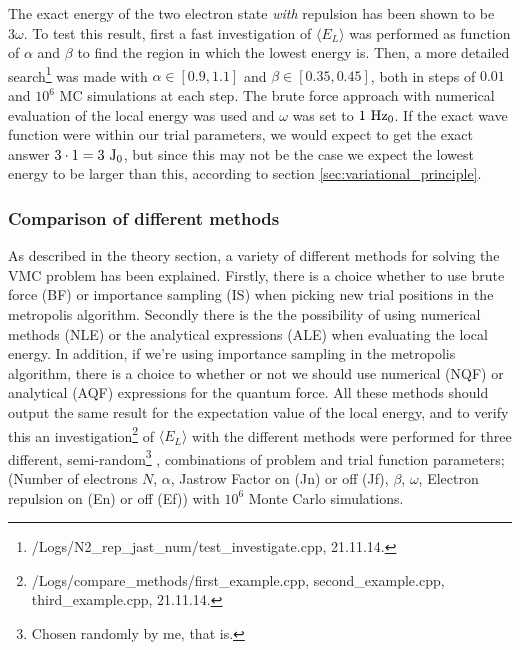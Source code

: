 The exact energy of the two electron state \textit{with} repulsion has been shown \cite{Taut} to be $3 \omega$. 
To test this result, first a fast investigation of $\langle E_L\rangle$ was performed as function of $\alpha$ and $\beta$ to find the region in which the lowest energy is. 
Then, a more detailed search\footnote{/Logs/N2\_rep\_jast\_num/test\_investigate.cpp, 21.11.14.} was made with $\alpha \in [0.9,1.1]$ and $\beta \in [0.35,0.45]$, both in steps of $0.01$ and $10^6$ MC simulations at each step. 
The brute force approach with numerical evaluation of the local energy was used and $\omega$ was set to $1 ~\textrm{Hz}_0$.
If the exact wave function were within our trial parameters, we would expect to get the exact answer $3 \cdot 1 = 3 ~\textrm{J}_0$, but since this may not be the case we expect the lowest energy to be larger than this, according to section \ref{sec:variational_principle}.

\subsubsection{Comparison of different methods} \label{sec:exp_methods_E}

As described in the theory section, a variety of different methods for solving the VMC problem has been explained. 
Firstly, there is a choice whether to use brute force (BF) or importance sampling (IS) when picking new trial positions in the metropolis algorithm.
Secondly there is the the possibility of using numerical methods (NLE) or the analytical expressions (ALE) when evaluating the local energy. 
In addition, if we're using importance sampling in the metropolis algorithm, there is a choice to whether or not we should 
use numerical (NQF) or analytical (AQF) expressions for the quantum force. 
All these methods should output the same result for the expectation value of the local energy, and to verify this an investigation\footnote{/Logs/compare\_methods/first\_example.cpp, second\_example.cpp, third\_example.cpp, 21.11.14.}
 of $\langle E_L \rangle$ with the different methods were performed for three different, semi-random\footnote{Chosen randomly by me, that is.}
, combinations of problem and trial function parameters; (Number of electrons $N$, $\alpha$, Jastrow Factor on (Jn) or off (Jf), $\beta$, $\omega$, Electron repulsion on (En) or off (Ef)) with $10^6$ Monte Carlo simulations.























